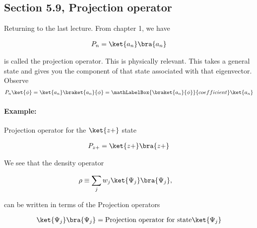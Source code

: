 \subsection{Section 5.9, Projection operator}

Returning to the last lecture.  From chapter 1, we have

\begin{equation}\label{eqn:PHY356Foct26:1000}
\begin{aligned}
P_n = \ket{a_n} \bra{a_n}
\end{aligned}
\end{equation}

is called the projection operator.  This is physically relevant.  This takes a general state and gives you the component of that state associated with that eigenvector.  Observe
\begin{equation}\label{eqn:PHY356Foct26:210}
\begin{aligned}
P_n \ket{\phi} =
\ket{a_n} \braket{a_n}{\phi}
=
\mathLabelBox{\braket{a_n}{\phi}}{coefficient}
\ket{a_n}
\end{aligned}
\end{equation}

\paragraph{Example:} Projection operator for the $\ket{z+}$ state

\begin{equation}\label{eqn:PHY356Foct26:211}
\begin{aligned}
P_{z+} = \ket{z+} \bra{z+}
\end{aligned}
\end{equation}

We see that the density operator

\begin{equation}\label{eqn:PHY356HNov2:40b}
\begin{aligned}
\rho &\equiv \sum_j w_j \ket{\Psi_j} \bra{\Psi_j},
\end{aligned}
\end{equation}

can be written in terms of the Projection operators

\begin{equation}\label{eqn:lecture8makingSenseOfQM:1120}
\begin{aligned}
\ket{\Psi_j} \bra{\Psi_j} = \text{Projection operator for state} \ket{\Psi_j}
\end{aligned}
\end{equation}

